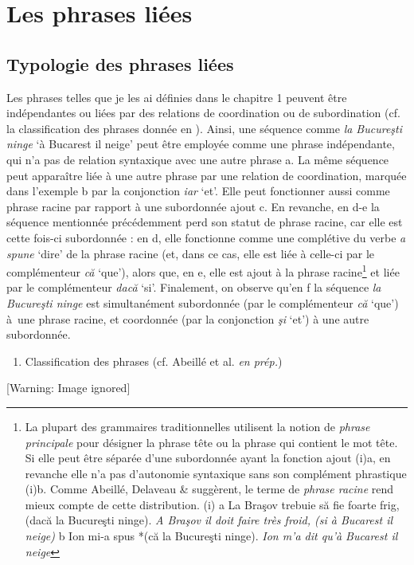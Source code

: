 
\section{Les phrases liées}
\subsection{Typologie des phrases liées} 
Les phrases telles que je les ai définies dans le chapitre 1 peuvent être indépendantes ou liées par des relations de coordination ou de subordination (cf. la classification des phrases donnée en ). Ainsi, une séquence comme \textit{la Bucureşti ninge} `à Bucarest il neige' peut être employée comme une phrase indépendante, qui n'a pas de relation syntaxique avec une autre phrase a. La même séquence peut apparaître liée à une autre phrase par une relation de coordination, marquée dans l'exemple b par la conjonction \textit{iar} `et'. Elle peut fonctionner aussi comme phrase racine par rapport à une subordonnée ajout c. En revanche, en d-e la séquence mentionnée précédemment perd son statut de phrase racine, car elle est cette fois-ci subordonnée : en d, elle fonctionne comme une complétive du verbe \textit{a spune} `dire' de la phrase racine (et, dans ce cas, elle est liée à celle-ci par le complémenteur \textit{că} `que'), alors que, en e, elle est ajout à la phrase racine\footnote{La plupart des grammaires traditionnelles utilisent la notion de \textit{phrase principale} pour désigner la phrase tête ou la phrase qui contient le mot tête. Si elle peut être séparée d'une subordonnée ayant la fonction ajout (i)a, en revanche elle n'a pas d'autonomie syntaxique sans son complément phrastique (i)b. Comme Abeillé, Delaveau \& \citet{Godard2007} suggèrent, le terme de \textit{phrase racine} rend mieux compte de cette distribution.
(i)  a  La Braşov trebuie să fie foarte frig, (dacă la Bucureşti ninge).
    \textit{A Braşov il doit faire très froid, (si à Bucarest il neige)}
  b  Ion mi-a spus *(că la Bucureşti ninge).
    \textit{Ion m'a dit qu'à Bucarest il neige}} et liée par le complémenteur \textit{dacă} `si'. Finalement, on observe qu'en f la séquence \textit{la Bucureşti ninge} est simultanément subordonnée (par le complémenteur \textit{că} `que') à~une phrase racine, et coordonnée (par la conjonction \textit{şi} `et') à une autre subordonnée.  


\begin{enumerate}
\item   \label{bkm:Ref300148662}Classification des phrases (cf. Abeillé et al. \textit{en prép.})


\end{enumerate}
{   [Warning: Image ignored] %
} 


